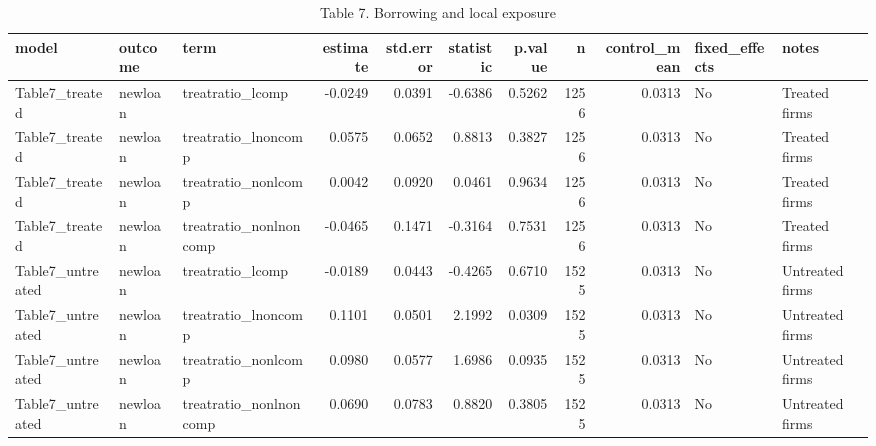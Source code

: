 \begin{table}

\caption{Table 7. Borrowing and local exposure}
\centering
\begin{tabular}[t]{lllrrrrrrll}
\toprule
model & outcome & term & estimate & std.error & statistic & p.value & n & control\_mean & fixed\_effects & notes\\
\midrule
Table7\_treated & newloan & treatratio\_lcomp & -0.0249 & 0.0391 & -0.6386 & 0.5262 & 1256 & 0.0313 & No & Treated firms\\
Table7\_treated & newloan & treatratio\_lnoncomp & 0.0575 & 0.0652 & 0.8813 & 0.3827 & 1256 & 0.0313 & No & Treated firms\\
Table7\_treated & newloan & treatratio\_nonlcomp & 0.0042 & 0.0920 & 0.0461 & 0.9634 & 1256 & 0.0313 & No & Treated firms\\
Table7\_treated & newloan & treatratio\_nonlnoncomp & -0.0465 & 0.1471 & -0.3164 & 0.7531 & 1256 & 0.0313 & No & Treated firms\\
Table7\_untreated & newloan & treatratio\_lcomp & -0.0189 & 0.0443 & -0.4265 & 0.6710 & 1525 & 0.0313 & No & Untreated firms\\
\addlinespace
Table7\_untreated & newloan & treatratio\_lnoncomp & 0.1101 & 0.0501 & 2.1992 & 0.0309 & 1525 & 0.0313 & No & Untreated firms\\
Table7\_untreated & newloan & treatratio\_nonlcomp & 0.0980 & 0.0577 & 1.6986 & 0.0935 & 1525 & 0.0313 & No & Untreated firms\\
Table7\_untreated & newloan & treatratio\_nonlnoncomp & 0.0690 & 0.0783 & 0.8820 & 0.3805 & 1525 & 0.0313 & No & Untreated firms\\
\bottomrule
\end{tabular}
\end{table}
